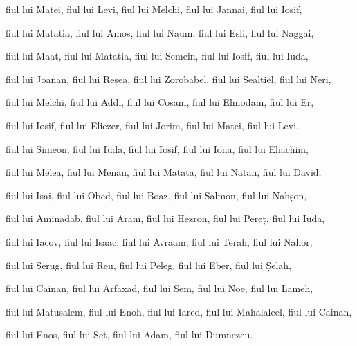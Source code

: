 {fiul lui Matei, fiul lui Levi, fiul lui Melchi, fiul lui Jannai, fiul lui Iosif,

fiul lui Matatia, fiul lui Amos, fiul lui Naum, fiul lui Esli, fiul lui Naggai,

fiul lui Maat, fiul lui Matatia, fiul lui Semein, fiul lui Iosif, fiul lui Iuda,

fiul lui Joanan, fiul lui Reșea, fiul lui Zorobabel, fiul lui Șealtiel, fiul lui Neri,

fiul lui Melchi, fiul lui Addi, fiul lui Cosam, fiul lui Elmodam, fiul lui Er,

fiul lui Iosif, fiul lui Eliezer, fiul lui Jorim, fiul lui Matei, fiul lui Levi,

fiul lui Simeon, fiul lui Iuda, fiul lui Iosif, fiul lui Iona, fiul lui Eliachim,

fiul lui Melea, fiul lui Menan, fiul lui Matata, fiul lui Natan, fiul lui David,

fiul lui Isai, fiul lui Obed, fiul lui Boaz, fiul lui Salmon, fiul lui Nahșon,

fiul lui Aminadab, fiul lui Aram, fiul lui Hezron, fiul lui Pereț, fiul lui Iuda,

fiul lui Iacov, fiul lui Isaac, fiul lui Avraam, fiul lui Terah, fiul lui Nahor,

fiul lui Serug, fiul lui Reu, fiul lui Peleg, fiul lui Eber, fiul lui Șelah,

fiul lui Cainan, fiul lui Arfaxad, fiul lui Sem, fiul lui Noe, fiul lui Lameh,

fiul lui Matusalem, fiul lui Enoh, fiul lui Iared, fiul lui Mahalaleel, fiul lui Cainan,

fiul lui Enos, fiul lui Set, fiul lui Adam, fiul lui Dumnezeu.



\par }
